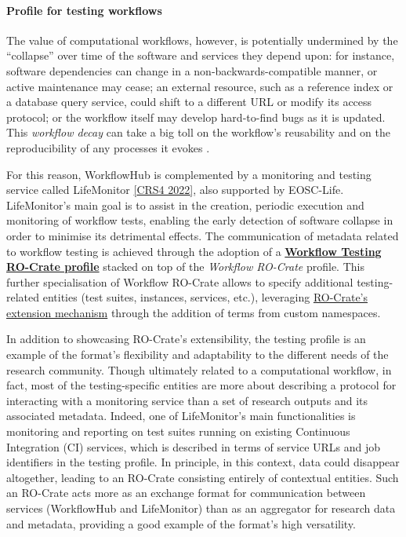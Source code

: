 {\hypertarget{profile-for-testing-workflows}{%
\paragraph{Profile for testing
workflows}\label{profile-for-testing-workflows}}

The value of computational workflows, however, is potentially undermined
by the ``collapse'' over time of the software and services they depend
upon: for instance, software dependencies can change in a
non-backwards-compatible manner, or active maintenance may cease; an
external resource, such as a reference index or a database query
service, could shift to a different URL or modify its access protocol;
or the workflow itself may develop hard-to-find bugs as it is updated.
This \emph{workflow decay} can take a big toll on the workflow's
reusability and on the reproducibility of any processes it evokes
\cite{ch5-125}.

For this reason, WorkflowHub is complemented by a monitoring and testing
service called LifeMonitor
\href{https://about.lifemonitor.eu/}{{[}CRS4 2022{]}}, also supported by
EOSC-Life. LifeMonitor's main goal is to assist in the creation,
periodic execution and monitoring of workflow tests, enabling the early
detection of software collapse in order to minimise its detrimental
effects. The communication of metadata related to workflow testing is
achieved through the adoption of a
\href{https://lifemonitor.eu/workflow_testing_ro_crate}{\textbf{Workflow
Testing RO-Crate profile}} stacked on top of the \emph{Workflow
RO-Crate} profile. This further specialisation of Workflow RO-Crate
allows to specify additional testing-related entities (test suites,
instances, services, etc.), leveraging
\href{https://www.researchobject.org/ro-crate/1.1/appendix/jsonld.html\#extending-ro-crate}{RO-Crate's
extension mechanism} through the addition of terms from custom
namespaces.

In addition to showcasing RO-Crate's extensibility, the testing profile
is an example of the format's flexibility and adaptability to the
different needs of the research community. Though ultimately related to
a computational workflow, in fact, most of the testing-specific entities
are more about describing a protocol for interacting with a monitoring
service than a set of research outputs and its associated metadata.
Indeed, one of LifeMonitor's main functionalities is monitoring and
reporting on test suites running on existing Continuous Integration (CI)
services, which is described in terms of service URLs and job
identifiers in the testing profile. In principle, in this context, data
could disappear altogether, leading to an RO-Crate consisting entirely
of contextual entities. Such an RO-Crate acts more as an exchange format
for communication between services (WorkflowHub and LifeMonitor) than as
an aggregator for research data and metadata, providing a good example
of the format's high versatility.

}
